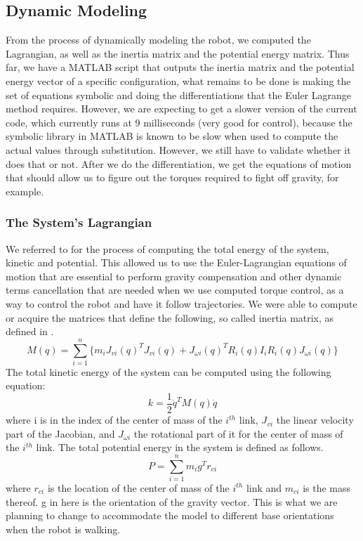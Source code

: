 \subsection{Dynamic Modeling}
From the process of dynamically modeling the robot, we computed the Lagrangian, as well as the inertia matrix and the potential energy matrix.
Thus far, we have a MATLAB script that outputs the inertia matrix and the potential energy vector of a specific configuration, what remains to be done is making the set of equations symbolic and doing the differentiations that the Euler Lagrange method requires.
However, we are expecting to get a slower version of the current code, which currently runs at 9 milliseconds (very good for control), because the symbolic library in MATLAB is known to be slow when used to compute the actual values through substitution. However, we still have to validate whether it does that or not.
After we do the differentiation, we get the equations of motion that should allow us to figure out the torques required to fight off gravity, for example.
\subsubsection{The System's Lagrangian}
We referred to \cite{spong2006robot} for the process of computing the total energy of the system, kinetic and potential. This allowed us to use the Euler-Lagrangian equations of motion that are essential to perform gravity compensation and other dynamic terms cancellation that are needed when we use computed torque control, as a way to control the robot and have it follow trajectories.
We were able to compute or acquire the matrices that define the following, so called inertia matrix, as defined in \cite{spong2006robot}.
$$
M(q) = \sum_{i=1}^n \{m_i J_{vi}(q)^T J_{vi}(q) + J_{\omega i}(q)^T R_i(q) I_i R_i(q) J_{\omega i}(q)\}
$$
The total kinetic energy of the system can be computed using the following equation:
$$
k = \frac{1}{2} \dot{q}^T M(q)\dot{q}
$$
where i is in the index of the center of mass of the $i^{th}$ link, $J_{vi}$ the linear velocity part of the Jacobian, and  $J_{\omega i}$ the rotational part of it for the center of mass of the $i^{th}$ link.
The total potential energy in the system is defined as follows.
$$
P = \sum_{i=1}^n  m_i g^T r_{ci}
$$
where $r_{ci}$ is the location of the center of mass of the $i^{th}$ link and $m_{ci}$ is the mass thereof. g in here is the orientation of the gravity vector. This is what we are planning to change to accommodate the model to different base orientations when the robot is walking.

